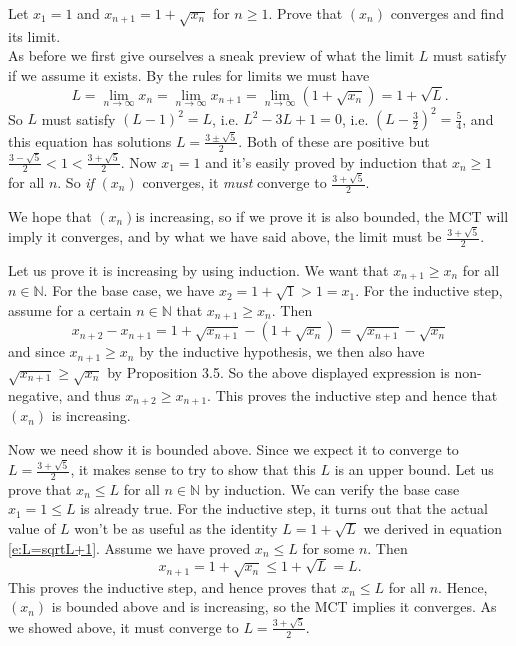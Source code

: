 \documentclass[11pt,dvipsnames]{book}
\numberwithin{equation}{section} %
\numberwithin{figure}{section} %
\numberwithin{table}{section} %
\begin{document}
\begin{example}
\label{ex:1+sqrt(x)}
Let $x_{1}=1$ and $x_{n+1}=1+\sqrt{x_{n}}$ for $n \geq 1$. Prove that $(x_{n})$ converges and find its limit. \\

As before we first give ourselves a sneak preview of what the limit $L$ must satisfy if we assume it exists. By the rules for limits we must have
\begin{equation}
\label{e:L=sqrtL+1}
L=\lim_{n\rightarrow\infty}x_{n}
=\lim_{n\rightarrow\infty}x_{n+1}=\lim_{n\rightarrow\infty}(1+\sqrt{x_{n}})=1+\sqrt{L}.
\end{equation}
So $L$ must satisfy $(L-1)^2 = L$, i.e. $L^2 -3L +1=0$, i.e. $(L-\frac{3}{2})^2 = \frac{5}{4}$, and this equation has solutions $L = \frac{3 \pm \sqrt{5}}{2}$. Both of these are positive but $ \frac{3 -\sqrt{5}}{2} < 1 < \frac{3 + \sqrt{5}}{2}$. Now $x_1 = 1$ and it's easily proved by induction that $x_n \geq 1$ for all $n$. So {\em if} $(x_n)$ converges, it {\em must} converge to $\frac{3 + \sqrt{5}}{2}$. 

We hope that $(x_n)$is increasing, so if we prove it is also bounded, the MCT will imply it converges, and by what we have said above, the limit must be $\frac{3 + \sqrt{5}}{2}$.

Let us prove it is increasing by using induction. We want that $x_{n+1}\geq x_{n}$ for all $n\in\mathbb{N}$. For the base case, we have $x_{2} = 1+\sqrt{1} > 1 = x_1$. For the inductive step, assume for a certain $n\in\mathbb{N}$ that $x_{n+1}\geq x_{n}$. Then
\[
x_{n+2}-x_{n+1}
=1+\sqrt{x_{n+1}}-(1+\sqrt{x_{n}})
=\sqrt{x_{n+1}}-\sqrt{x_{n}}
\]
and since $x_{n+1}\geq x_{n}$ by the inductive hypothesis, we then also have $\sqrt{x_{n+1}}\geq \sqrt{x_{n}}$ by Proposition 3.5. So the above displayed expression is non-negative, and thus $x_{n+2}\geq x_{n+1}$. This proves the inductive step and hence that $(x_n)$ is increasing. 

Now we need show it is bounded above. Since we expect it to converge to $L = \frac{3 + \sqrt{5}}{2}$, it makes sense to try to show that this $L$ is an upper bound.
Let us prove that $x_{n}\leq L$ for all $n\in\mathbb{N}$ by induction.
We can verify the base case $x_{1}=1\leq L$ is already true. For the inductive step, it turns out that the actual value of $L$ won't be as useful as the identity $L=1+\sqrt{L}$ we derived in equation \eqref{e:L=sqrtL+1}. Assume we have proved $x_{n}\leq L$ for some $n$. Then
\[
x_{n+1}=1+\sqrt{x_{n}}\leq 1+\sqrt{L}=L. 
\]
This proves the inductive step, and hence proves that $x_{n}\leq L$ for all $n$. Hence, $(x_n)$ is bounded above and is increasing, so the MCT implies it converges. As we showed above, it must converge to $L = \frac{3 + \sqrt{5}}{2}$. 
\end{example}
\end{document}
